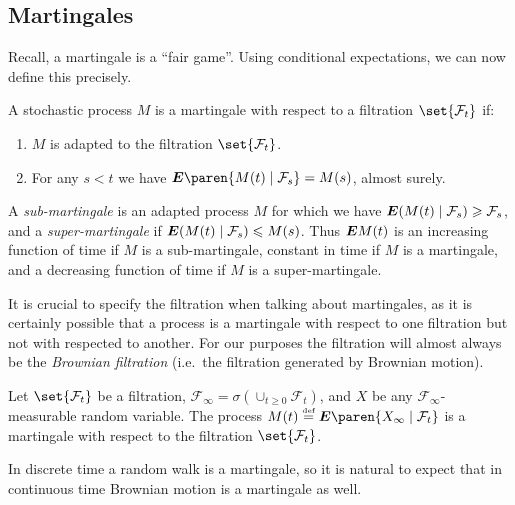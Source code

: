 \subsection{Martingales}

Recall, a martingale is a ``fair game''.
Using conditional expectations, we can now define this precisely.

\begin{definition}
  A stochastic process $M$ is a martingale with respect to a filtration $\set{\mathcal F_t}$ if:
  \begin{enumerate}
    \item
       $M$ is adapted to the filtration $\set{\mathcal F_t}$.
    \item
      For any $s < t$ we have $\E\paren{ M(t) \given \mathcal F_s} = M(s)$, almost surely.
  \end{enumerate}
\end{definition}
\begin{remark}
  A \emph{sub-martingale} is an adapted process $M$ for which we have $\E(M(t) \given \mathcal F_s) \geq \mathcal F_s$, and a \emph{super-martingale} if $\E( M(t) \given \mathcal F_s) \leq M(s)$.
  Thus $\bm{E} M(t)$ is an increasing function of time if $M$ is a sub-martingale, constant in time if $M$ is a martingale, and a decreasing function of time if $M$ is a super-martingale.
\end{remark}

\begin{remark}
  It is crucial to specify the filtration when talking about martingales, as it is certainly possible that a process is a martingale with respect to one filtration but not with respected to another.
  For our purposes the filtration will almost always be the \emph{Brownian filtration} (i.e.\ the filtration generated by Brownian motion).
\end{remark}

\begin{example}
  Let $\set{\mathcal F_t}$ be a filtration, $\mathcal F_\infty = \sigma( \cup_{t \geq 0} \mathcal F_t )$, and $X$ be any $\mathcal F_\infty$-measurable random variable.
  The process $M(t) \defeq \E\paren{ X_\infty \given \mathcal F_t }$ is a martingale with respect to the filtration $\set{\mathcal F_t}$.
\end{example}


In discrete time a random walk is a martingale, so it is natural to expect that in continuous time Brownian motion is a martingale as well.

